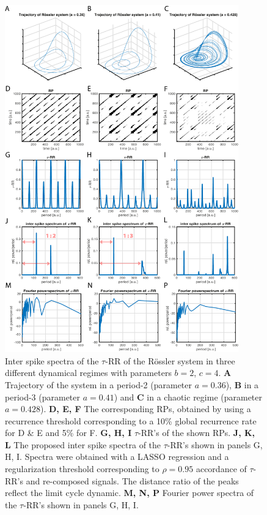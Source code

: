 \documentclass[entropy,article,submit,pdftex,moreauthors]{Definitions/mdpi}
\begin{document}
\begin{figure}
 \centering
 \includegraphics[width=0.9\textwidth]{./figures/fig_tau_rr_example_roessler}
 \caption{Inter spike spectra of the $\tau$-RR of the R\"ossler system in three different dynamical regimes with parameters $b=2$, $c=4$. 
 \textbf{A} Trajectory of the system in a period-2 (parameter $a=0.36$), \textbf{B} in a period-3 (parameter $a=0.41$) and 
 \textbf{C} in a chaotic regime (parameter $a=0.428$). 
 \textbf{D, E, F} The corresponding RPs, obtained by using a recurrence threshold corresponding to a 10\% global 
 recurrence rate for D \& E and 5\% for F. 
  \textbf{G, H, I} $\tau$-RR's of the shown RPs. 
  \textbf{J, K, L} The proposed inter spike spectra of the $\tau$-RR's shown in panels G, H, I. Spectra were obtained with a LASSO regression and a regularization threshold 
  corresponding to $\rho=0.95$ accordance of $\tau$-RR's and re-composed signals. The distance ratio of the peaks reflect the limit cycle dynamic.  
  \textbf{M, N, P} Fourier power spectra of the $\tau$-RR's shown in panels G, H, I.
 }
\label{fig_tau_rr_example_roessler}
\end{figure}
\end{document}

